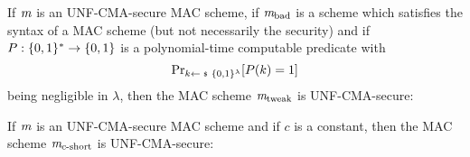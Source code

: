 \begin{theorem}
If $\mathit{{m}}$ is an UNF-CMA-secure MAC scheme, if $\mathit{{m}}_{\text{bad}}$ is a scheme which satisfies the syntax of a MAC scheme
(but not necessarily the security) and if $P:\{0,1\}^*\rightarrow\{0,1\}$ is a polynomial-time computable predicate with
\[\probsub{k\sample\bin^\lambda}{P(k)=1}\]
being negligible in $\lambda$, then the MAC scheme $\mathit{{m}}_{\text{tweak}}$ is UNF-CMA-secure:
\begin{center}
\begin{pchstack}
\pchspace
{}
\end{pchstack}
\end{center}
\end{theorem}

\begin{theorem}
If $\mathit{{m}}$ is an UNF-CMA-secure MAC scheme and if $c$ is a constant, then the MAC scheme $\mathit{{m}}_{c\text{-short}}$ is UNF-CMA-secure:
\begin{center}
\begin{pchstack}
\pchspace
{}
\end{pchstack}
\end{center}
\end{theorem}
